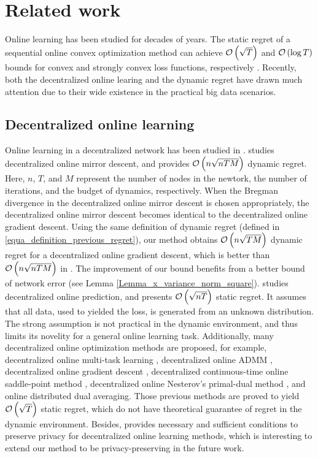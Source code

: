 \documentclass{article}
\begin{document}
\section{Related work}
\label{sect_related_work}
Online learning has been studied for decades of years. The static regret of a sequential online convex optimization method can achieve ${\mathcal{O}\left( \sqrt{T} \right)}$ and ${\mathcal{O}\left( \log T \right)}$ bounds for convex and strongly convex loss functions, respectively \citep{Hazan2016Introduction,ShalevShwartz:2012dz,introduction-online-optimization}. Recently, both the decentralized online learing and the dynamic regret have drawn much attention due to their wide existence in the practical big data scenarios.
\subsection{Decentralized online learning}
Online learning in a decentralized network has been studied in \citep{8015179Shahram,Kamp:2014:CDO,Koppel-8352032,Zhang2018,pmlr-v70-zhang17g,Xu2015,tcns-7353155,cdc-7798923,acc-7172037,tcns-7479495,Benczur:2018ww,tkde-6311406}.  \citet{8015179Shahram} studies decentralized online mirror descent, and provides ${\mathcal{O}\left( n\sqrt{nTM} \right)}$ dynamic regret. Here, $n$, $T$, and $M$ represent the number of nodes in the newtork, the number of iterations, and the budget of dynamics, respectively.  When the Bregman divergence in the decentralized online mirror descent is chosen appropriately, the decentralized online mirror descent becomes identical to the decentralized online gradient descent. Using the same definition of dynamic regret (defined in \eqref{equa_definition_previous_regret}), our method obtains ${\mathcal{O}\left( n\sqrt{TM} \right)}$ dynamic regret for a decentralized online gradient descent, which is better than ${\mathcal{O}\left( n\sqrt{nTM} \right)}$ in \citet{8015179Shahram}. The improvement of our bound benefits from a better bound of network error (see Lemma \ref{Lemma_x_variance_norm_square}). \citet{Kamp:2014:CDO} studies decentralized online prediction, and presents ${\mathcal{O}\left( \sqrt{nT} \right)}$ static regret.  It assumes that all data, used to yielded the loss, is generated from an unknown distribution. The strong assumption is not practical in the dynamic environment, and thus limits its novelity for a general online learning task. 
Additionally, many decentralized online optimization methods are proposed, for example, decentralized online multi-task learning \citep{Zhang2018}, decentralized online ADMM \citep{Xu2015}, decentralized online gradient descent \citep{tcns-7353155}, decentralized continuous-time online saddle-point method \citep{cdc-7798923}, decentralized online  Nesterov's primal-dual method \citep{acc-7172037,tcns-7479495}, and online distributed dual averaging\citep{6760092}. Those previous methods are proved to yield ${\mathcal{O}\left( \sqrt{T} \right)}$ static regret, which do not have theoretical guarantee of regret in the dynamic environment.   Besides,  \citet{tkde-6311406} provides necessary and sufficient conditions to preserve privacy for decentralized online learning methods, which  is interesting to extend our method to be privacy-preserving in the future work.
\end{document}
